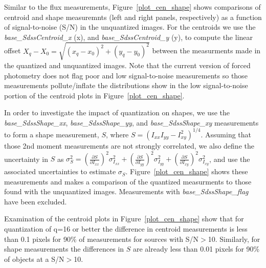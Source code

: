 Similar to the flux measurements, Figure~\ref{plot_cen_shape} shows comparisons of centroid
and shape measuremnts (left and right panels, respectively) as a function of signal-to-noise
(S/N) in the unquantized images.  For the centroids we use the {\it base\_SdssCentroid\_x} (x), and 
{\it base\_SdssCentroid\_y} (y), to compute the linear offset 
$X_q-X_0 = \sqrt{ (x_q-x_0)^2 + (y_q-y_0)^2}$ between the measurments
made in the quantized and unquantized images.  Note that the current version of forced photometry 
does not flag poor and low signal-to-noise measurements so those measurements pollute/inflate the 
distributions show in the low signal-to-noise portion of the centroid plots in Figure~\ref{plot_cen_shape}.

In order to investigate the impact of quantization on shapes, we use the {\it base\_SdssShape\_xx}, 
{\it base\_SdssShape\_yy}, and {\it base\_SdssShape\_xy} measurements to form a shape measurement, 
$S$, where $S=(I_{xx} I_{yy} - I_{xy}^2)^{1/4}$.
Assuming that those 2nd moment measurements are not strongly correlated, we also define
the uncertainty in $S$ as 
$\sigma_S^2 = (\frac{\partial S}{\partial I_{xx}})^2 \sigma_{I_{xx}}^2 + 
(\frac{\partial S}{\partial I_{yy}})^2 \sigma_{I_{yy}}^2 + 
(\frac{\partial S}{\partial I_{xy}})^2 \sigma_{I_{xy}}^2$, and use the associated uncertainties
to estimate $\sigma_S$.  Figure~\ref{plot_cen_shape} shows these measurements and makes a comparison
of the quantized measurments to those found with the unquantized images.  Measurements with 
{\it base\_SdssShape\_flag} have been excluded.

Examination of the centroid plots in Figure~\ref{plot_cen_shape} show that for quantization of q=16 or
better the difference in centroid measurements is less than 0.1 pixels for 90\% of measurements for
sources with S/N$>$10.  Similarly, for shape measurements the differences in $S$ are already less than 
0.01 pixels for 90\% of objects at a S/N$>$10.  

